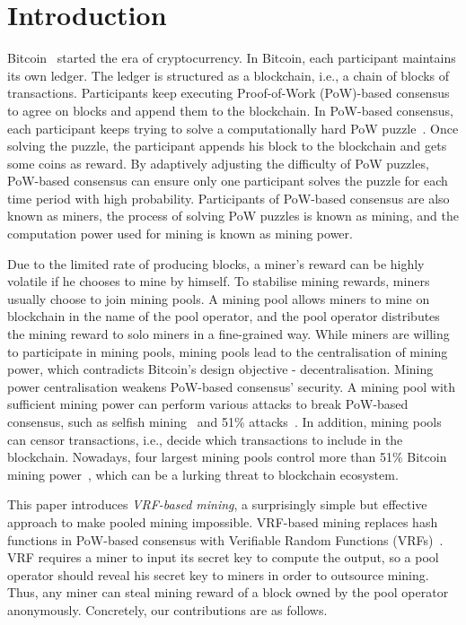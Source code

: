 \section{Introduction}
\label{sec:intro}

Bitcoin~\cite{nakamoto2008bitcoin} started the era of cryptocurrency.
In Bitcoin, each participant maintains its own ledger.
The ledger is structured as a blockchain, i.e., a chain of blocks of transactions.
Participants keep executing Proof-of-Work (PoW)-based consensus to agree on blocks and append them to the blockchain.
In PoW-based consensus, each participant keeps trying to solve a computationally hard PoW puzzle~\cite{dwork1992pricing}.
Once solving the puzzle, the participant appends his block to the blockchain and gets some coins as reward.
By adaptively adjusting the difficulty of PoW puzzles, PoW-based consensus can ensure only one participant solves the puzzle for each time period with high probability.
Participants of PoW-based consensus are also known as miners, the process of solving PoW puzzles is known as mining, and the computation power used for mining is known as mining power.

Due to the limited rate of producing blocks, a miner's reward can be highly volatile if he chooses to mine by himself.
To stabilise mining rewards, miners usually choose to join mining pools.
A mining pool allows miners to mine on blockchain in the name of the pool operator, and the pool operator distributes the mining reward to solo miners in a fine-grained way.
While miners are willing to participate in mining pools, mining pools lead to the centralisation of mining power, which contradicts Bitcoin's design objective - decentralisation.
Mining power centralisation weakens PoW-based consensus' security.
A mining pool with sufficient mining power can perform various attacks to break PoW-based consensus, such as selfish mining~\cite{eyal2018majority} and 51\% attacks~\cite{nakamoto2008bitcoin}.
In addition, mining pools can censor transactions, i.e., decide which transactions to include in the blockchain.
Nowadays, four largest mining pools control more than 51\% Bitcoin mining power~\cite{btc-com}, which can be a lurking threat to blockchain ecosystem.

This paper introduces \textit{VRF-based mining}, a surprisingly simple but effective approach to make pooled mining impossible.
VRF-based mining replaces hash functions in PoW-based consensus with Verifiable Random Functions (VRFs)~\cite{micali1999verifiable}.
VRF requires a miner to input its secret key to compute the output, so a pool operator should reveal his secret key to miners in order to outsource mining.
Thus, any miner can steal mining reward of a block owned by the pool operator anonymously.
Concretely, our contributions are as follows.

